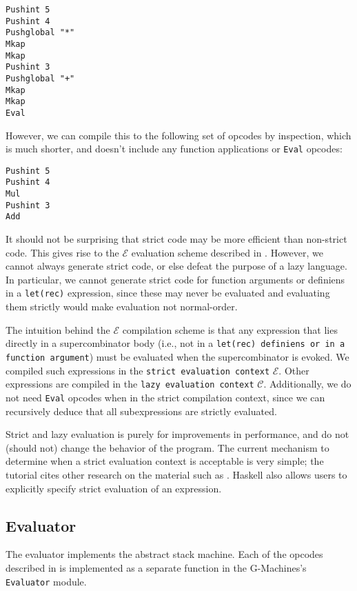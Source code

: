 \begin{verbatim}
Pushint 5
Pushint 4
Pushglobal "*"
Mkap
Mkap
Pushint 3
Pushglobal "+"
Mkap
Mkap
Eval
\end{verbatim}

However, we can compile this to the following set of opcodes by inspection, which is much shorter, and doesn't include any function applications or \texttt{Eval} opcodes:

\begin{verbatim}
Pushint 5
Pushint 4
Mul
Pushint 3
Add
\end{verbatim}

It should not be surprising that strict code may be more efficient than non-strict code. This gives rise to the $\mathcal{E}$ evaluation scheme described in . However, we cannot always generate strict code, or else defeat the purpose of a lazy language. In particular, we cannot generate strict code for function arguments or definiens in a \texttt{let(rec)} expression, since these may never be evaluated and evaluating them strictly would make evaluation not normal-order.

The intuition behind the $\mathcal{E}$ compilation scheme is that any expression that lies directly in a supercombinator body (i.e., not in a \texttt{let(rec) definiens or in a function argument}) must be evaluated when the supercombinator is evoked. We compiled such expressions in the \texttt{strict evaluation context} $\mathcal{E}$. Other expressions are compiled in the \texttt{lazy evaluation context} $\mathcal{C}$. Additionally, we do not need \texttt{Eval} opcodes when in the strict compilation context, since we can recursively deduce that all subexpressions are strictly evaluated.

Strict and lazy evaluation is purely for improvements in performance, and do not (should not) change the behavior of the program. The current mechanism to determine when a strict evaluation context is acceptable is very simple; the tutorial cites other research on the material such as \cite{burn1991lazy}. Haskell also allows users to explicitly specify strict evaluation of an expression.

\subsection{Evaluator}
\label{sec:evaluator}

The evaluator implements the abstract stack machine. Each of the opcodes described in  is implemented as a separate function in the G-Machines's \texttt{Evaluator} module.

